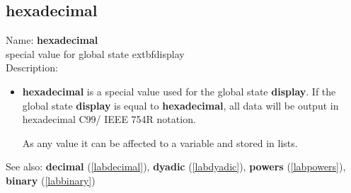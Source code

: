 \subsection{hexadecimal}
\label{labhexadecimal}
\noindent Name: \textbf{hexadecimal}\\
special value for global state 	extbf{display}\\
\noindent Description: \begin{itemize}

\item \textbf{hexadecimal} is a special value used for the global state \textbf{display}.  If
   the global state \textbf{display} is equal to \textbf{hexadecimal}, all data will be
   output in hexadecimal C99/ IEEE 754R notation.
    
   As any value it can be affected to a variable and stored in lists.
\end{itemize}
See also: \textbf{decimal} (\ref{labdecimal}), \textbf{dyadic} (\ref{labdyadic}), \textbf{powers} (\ref{labpowers}), \textbf{binary} (\ref{labbinary})
